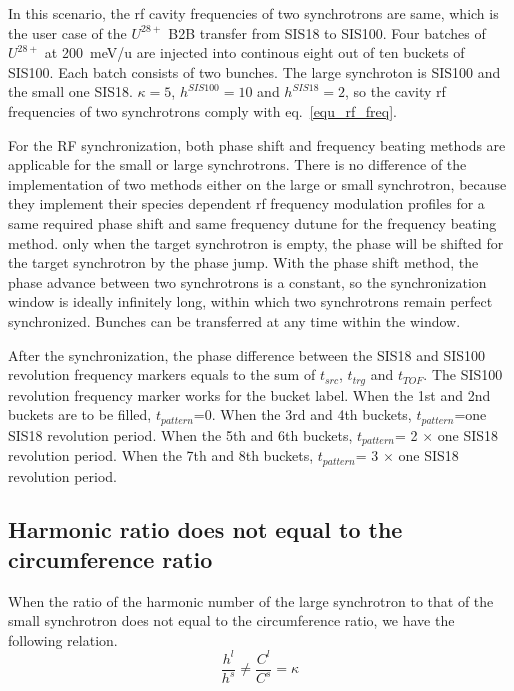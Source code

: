 In this scenario, the rf cavity frequencies of two synchrotrons are same, which is the user case of the $U^{28+}$ B2B transfer from SIS18 to SIS100. Four batches of $U^{28+}$ at \SI{200}{meV/\atomicmassunit} are injected into continous eight out of ten buckets of SIS100. Each batch consists of two bunches. The large synchroton is SIS100 and the small one SIS18. $\kappa=5$, $h^{SIS100}=10$ and $h^{SIS18}=2$, so the cavity rf frequencies of two synchrotrons comply with eq.~\ref{equ_rf_freq}.

For the RF synchronization, both phase shift and frequency beating methods are applicable for the small or large synchrotrons. There is no difference of the implementation of two methods either on the large or small synchrotron, because they implement their species dependent rf frequency modulation profiles for a same required phase shift and same frequency dutune for the frequency beating method. only when the target synchrotron is empty, the phase will be shifted for the target synchrotron by the phase jump. With the phase shift method, the phase advance between two synchrotrons is a constant, so the synchronization window is ideally infinitely long, within which two synchrotrons remain perfect synchronized. Bunches can be transferred at any time within the window.  

After the synchronization, the phase difference between the SIS18 and SIS100 revolution frequency markers equals to the sum of $t_{src}$, $t_{trg}$ and $t_{TOF}$. The SIS100 revolution frequency marker works for the bucket label. When the 1st and 2nd buckets are to be filled, $t_{pattern}$=0. When the 3rd and 4th buckets, $t_{pattern}$=one SIS18 revolution period. When the 5th and 6th buckets, $t_{pattern}$= 2 $\times$ one SIS18 revolution period. When the 7th and 8th buckets, $t_{pattern}$= 3 $\times$ one SIS18 revolution period. 

\subsection{Harmonic ratio does not equal to the circumference ratio} 
\label{sec:cir_no_int1}
When the ratio of the harmonic number of the large synchrotron to that of the small synchrotron does not equal to the circumference ratio, we have the following relation.
\begin{equation}
\frac {h^{l}}{h^{s}}\neq \frac {C^{l}}{C^{s}}= \kappa  \label{harmonic_1_noint}
\end{equation}

